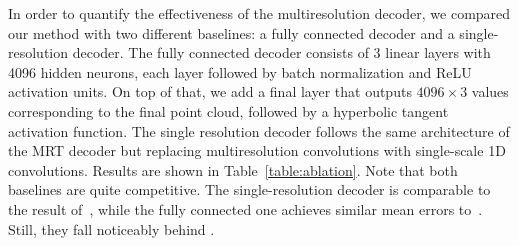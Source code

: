 In order to quantify the effectiveness of the multiresolution decoder, we compared our method with two
different baselines: a fully connected decoder and a single-resolution decoder.
The fully connected decoder consists of 3 linear layers with 4096 hidden neurons, each layer followed by batch normalization 
and ReLU activation units.
On top of that, we add a final layer that outputs $4096\times3$ values corresponding to the final point cloud, followed
by a hyperbolic tangent activation function.
The single resolution decoder follows the same architecture of the MRT decoder but replacing multiresolution convolutions with single-scale 1D convolutions.
Results are shown in Table~\ref{table:ablation}.
Note that both baselines are quite competitive. 
The single-resolution decoder is comparable to the result of~\cite{lin2018learning}, while the fully connected one achieves similar mean errors to~\cite{fan2016point}.
Still, they fall noticeably behind \mrtnet.


